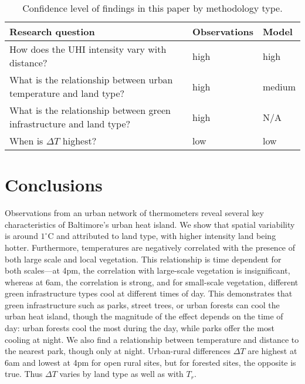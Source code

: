 \begin{table}
\centering
\begin{tabular}{p{9cm} l l }
\toprule
Research question & Observations &  Model \\
\midrule
How does the UHI intensity  vary with distance? & high & high \\
What is the relationship between urban temperature and land type? & high & medium \\
What is the relationship between green infrastructure and land type? & high & N/A \\
When is $\Delta T$ highest? & low & low \\
\bottomrule
\end{tabular}
\caption{Confidence level of findings in this paper by methodology type.}
\label{tab:confidence}
\end{table}


\section{Conclusions}\label{sec:conclusions}
Observations from an urban network of thermometers reveal several key characteristics of Baltimore's urban heat island. We show that spatial variability is around $1^\circ$C and attributed to land type, with higher intensity land being hotter. 
Furthermore, temperatures are negatively correlated with the presence of both large scale and local vegetation. This relationship is time dependent for both scales---at 4pm, the correlation with large-scale vegetation is insignificant, whereas at 6am, the correlation is strong, and for small-scale vegetation, different green infrastructure types cool at different times of day.  
This demonstrates that green infrastructure such as parks, street trees, or urban forests can cool the urban heat island, though the magnitude of the effect depends on the time of day: urban forests cool the most during the day, while parks offer the most cooling at night. 
We also find a relationship between temperature and distance to the nearest park, though only at night.
 Urban-rural differences $\Delta T$ are highest at 6am and lowest at 4pm for open rural sites, but for forested sites, the opposite is true. Thus $\Delta T$ varies by land type as well as with $T_r$.

